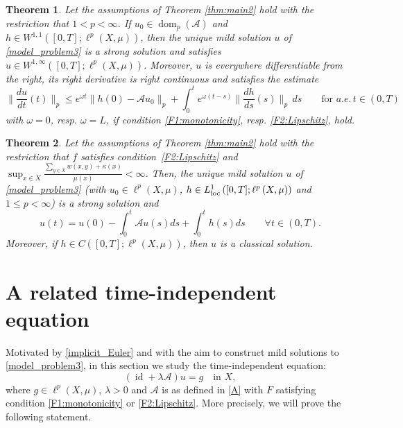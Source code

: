 \documentclass[journal]{article}
\newtheorem{theorem}{Theorem}[section]
\theoremstyle{nonitalic}
\theoremstyle{nonitalic}
\theoremstyle{plain} %
\numberwithin{equation}{section}
\newcommand{\dom}{\operatorname{dom}}
\begin{document}
\begin{theorem}\label{thm:regularity}
Let the assumptions of Theorem \ref{thm:main2} hold with the restriction that $1< p <\infty$.  If $u_0 \in  {\dom_p(\mathcal{A})}$ and $h \in W^{1,1}\left([0,T]; \ell^p\left(X,\mu\right)\right)$, then the unique mild solution $u$ of \eqref{model_problem3} is a strong solution and satisfies $u\in W^{1,\infty}\left([0,T]; \ell^p\left(X,\mu\right)\right)$. Moreover, $u$ is everywhere differentiable from the right, its right derivative is right continuous and satisfies the estimate
$$\Big\|\frac{d u}{d t}(t)\Big\|_p\leq e^{\omega t}\|h(0)- \mathcal{A} u_0\|_p+\int_0^t e^{\omega(t-s)} \Big\|\frac{d h}{d s}(s)\Big\|_p\, ds \qquad \text{for } a.e.\, t \in (0,T)$$
with $\omega=0$, resp. $\omega=L$, if condition \textnormal{\ref{F1:monotonicity}}, resp. \textnormal{\ref{F2:Lipschitz}}, hold.
\end{theorem}

\begin{theorem}\label{thm:regularity2}
Let the assumptions of Theorem \ref{thm:main2} hold with the restriction that $f$ satisfies condition~\ref{F2:Lipschitz} and $\sup_{x\in X}\frac{\sum_{y\in X}w(x,y)+\kappa(x)}{\mu(x)}<\infty$. Then, the unique mild solution $u$ of \eqref{model_problem3} (with $u_0 \in \ell^p(X,\mu)$, $h \in L^1_{\textnormal{loc}}\left([0,T]; \ell^p\left(X,\mu\right)\right)$ and $1\leq p <\infty$) is a strong solution and 
$$
u(t)=u(0)-\int_0^t\mathcal Au(s)ds+\int_0^th(s)ds\qquad \forall t\in (0,T).
$$
Moreover, if $h\in C([0,T];\ell^p(X,\mu))$, then $u$ is a classical solution.
\end{theorem}





 


\section{A related time-independent equation}\label{auxiliary section}

Motivated by \eqref{implicit_Euler} and with the aim to construct mild solutions to \eqref{model_problem3}, in this section we study the time-independent equation:
\begin{equation}\label{model_equation(discrete)}
 (\operatorname{id} + \lambda \mathcal{A})u = g \quad \text{in }X,
\end{equation}
where $g \in \ell^p(X,\mu)$, $\lambda>0$ and $\mathcal{A}$ is as defined in \eqref{A} with $F$ satisfying condition \textnormal{\ref{F1:monotonicity}} or \textnormal{\ref{F2:Lipschitz}}. More precisely, we will prove the following statement.      
\end{document}
